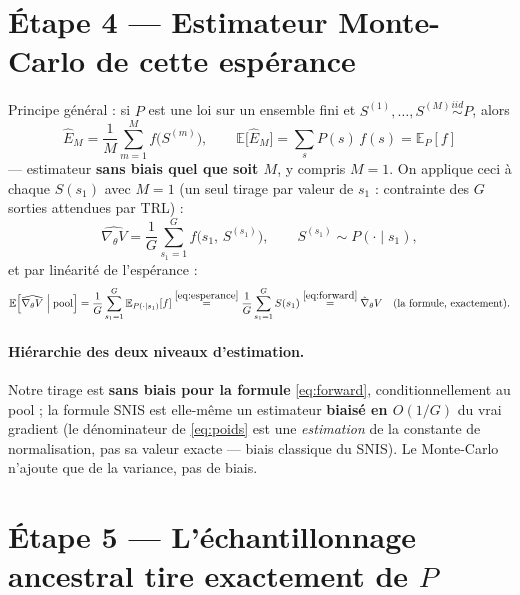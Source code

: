 \documentclass{article}
\newcommand{\E}{\mathbb{E}}
\begin{document}
\section{Étape 4 --- Estimateur Monte-Carlo de cette espérance}

Principe général : si $P$ est une loi sur un ensemble fini et
$S^{(1)}, \ldots, S^{(M)} \overset{iid}{\sim} P$, alors
\begin{equation}
\widehat{E}_M = \frac{1}{M} \sum_{m=1}^{M} f\big(S^{(m)}\big),
\qquad
\E\big[\widehat{E}_M\big] = \sum_{s} P(s)\, f(s) = \E_P[f]
\end{equation}
--- estimateur \textbf{sans biais quel que soit $M$}, y compris $M=1$. On applique
ceci à chaque $S(s_1)$ avec $M=1$ (un seul tirage par valeur de $s_1$ : contrainte
des $G$ sorties attendues par TRL) :
\begin{equation}
\widehat{\nabla_\theta V}
= \frac{1}{G} \sum_{s_1=1}^{G} f\big(s_1,\, S^{(s_1)}\big),
\qquad S^{(s_1)} \sim P(\cdot \mid s_1),
\label{eq:estimateur}
\end{equation}
et par linéarité de l'espérance :
\begin{equation}
\E\Big[\widehat{\nabla_\theta V} \;\Big|\; \text{pool}\Big]
= \frac{1}{G} \sum_{s_1=1}^{G} \E_{P(\cdot \mid s_1)}[f]
\overset{\eqref{eq:esperance}}{=} \frac{1}{G} \sum_{s_1=1}^{G} S(s_1)
\overset{\eqref{eq:forward}}{=} \hat{\nabla}_\theta V
\quad \text{(la formule, exactement).}
\end{equation}

\paragraph{Hiérarchie des deux niveaux d'estimation.} Notre tirage est
\textbf{sans biais pour la formule} \eqref{eq:forward}, conditionnellement au pool ;
la formule SNIS est elle-même un estimateur \textbf{biaisé en $O(1/G)$} du vrai
gradient (le dénominateur de \eqref{eq:poids} est une \emph{estimation} de la
constante de normalisation, pas sa valeur exacte --- biais classique du SNIS). Le
Monte-Carlo n'ajoute que de la variance, pas de biais.

\section{Étape 5 --- L'échantillonnage ancestral tire exactement de $P$}
\end{document}
